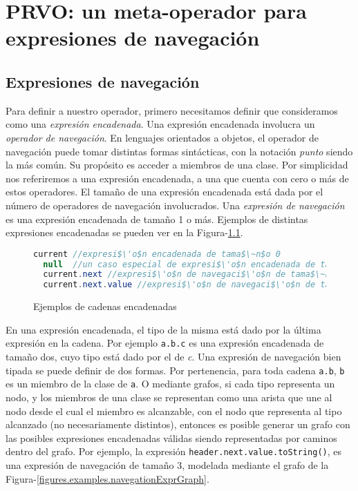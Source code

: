 \chapter[PRVO]{PRVO: un meta-operador para expresiones de navegaci\'on}
\label{cap:prvo}

\section{Expresiones de navegaci\'on}
\label{sec:prvo.navigationalExpressions}

Para definir a nuestro operador, primero necesitamos definir que consideramos como una \emph{expresi\'on encadenada}. Una expresi\'on encadenada involucra un \emph{operador de navegaci\'on}. En lenguajes orientados a objetos, el operador de navegaci\'on puede tomar distintas formas sint\'acticas, con la notaci\'on \emph{punto} siendo la m\'as com\'un. Su prop\'osito es acceder a miembros de una clase. Por simplicidad nos referiremos a una expresi\'on encadenada, a una que cuenta con cero o m\'as de estos operadores. El tama\~no de una expresi\'on encadenada est\'a dada por el n\'umero de operadores de navegaci\'on involucrados. Una \emph{expresi\'on de navegaci\'on} es una expresi\'on encadenada de tama\~no 1 o m\'as. Ejemplos de distintas expresiones encadenadas se pueden ver en la Figura-\ref{figures.examples.chainedExpr}.

\begin{figure}
	\begin{lstlisting}[mathescape=true, language=Java, extendedchars=true]
  current //expresi$\'o$n encadenada de tama$\~n$o 0
  null 	//un caso especial de expresi$\'o$n encadenada de tama$\~n$o 0
  current.next //expresi$\'o$n de navegaci$\'o$n de tama$\~n$o 1
  current.next.value //expresi$\'o$n de navegaci$\'o$n de tama$\~n$o 2
	\end{lstlisting}
	\caption{Ejemplos de cadenas encadenadas}
	\label{figures.examples.chainedExpr}
\end{figure}

En una expresi\'on encadenada, el tipo de la misma est\'a dado por la \'ultima expresi\'on en la cadena. Por ejemplo \lstinline|a.b.c| es una expresi\'on encadenada de tama\~no dos, cuyo tipo est\'a dado por el de \emph{c}. Una expresi\'on de navegaci\'on bien tipada se puede definir de dos formas. Por pertenencia, para toda cadena \texttt{a.b}, \texttt{b} es un miembro de la clase de \texttt{a}. O mediante grafos, si cada tipo representa un nodo, y los miembros de una clase se representan como una arista que une al nodo desde el cual el miembro es alcanzable, con el nodo que representa al tipo alcanzado (no necesariamente distintos), entonces es posible generar un grafo con las posibles expresiones encadenadas v\'alidas siendo representadas por caminos dentro del grafo. Por ejemplo, la expresi\'on \lstinline|header.next.value.toString()|, es una expresi\'on de navegaci\'on de tama\~no 3, modelada mediante el grafo de la Figura-\ref{figures.examples.navegationExprGraph}.

